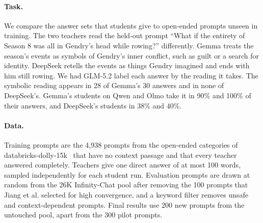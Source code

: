 \documentclass{article}
\begin{document}
\paragraph{Task.}
We compare the answer sets that students give to open-ended prompts unseen in training. The two teachers read the held-out prompt ``What if the entirety of Season 8 was all in Gendry's head while rowing?'' differently. Gemma treats the season's events as symbols of Gendry's inner conflict, such as guilt or a search for identity. DeepSeek retells the events as things Gendry imagined and ends with him still rowing. We had GLM-5.2 label each answer by the reading it takes. The symbolic reading appears in 28 of Gemma's 30 answers and in none of DeepSeek's. Gemma's students on Qwen and Olmo take it in 90\% and 100\% of their answers, and DeepSeek's students in 38\% and 40\%.

\paragraph{Data.}
Training prompts are the 4,938 prompts from the open-ended categories of databricks-dolly-15k~\cite{conover2023dolly} that have no context passage and that every teacher answered completely. Teachers give one direct answer of at most 100 words, sampled independently for each student run. Evaluation prompts are drawn at random from the 26K Infinity-Chat pool after removing the 100 prompts that Jiang et al. selected for high convergence, and a keyword filter removes unsafe and context-dependent prompts. Final results use 200 new prompts from the untouched pool, apart from the 300 pilot prompts.
\end{document}

